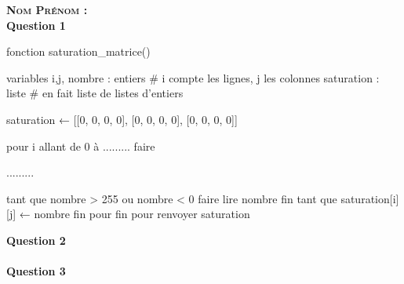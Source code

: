 \documentclass[a4paper,12pt]{article}
\begin{document}
{\large\bfseries \scshape Nom Prénom : \makebox[6cm]{\dotfill}}\\

\textbf{Question 1}\\

\begin{algo}    
fonction saturation_matrice()
    
    variables
        i,j, nombre : entiers # i compte les lignes, j les colonnes
        saturation  : liste  # en fait liste de listes d'entiers

    saturation ← [[0, 0, 0, 0], [0, 0, 0, 0], [0, 0, 0, 0]]
   
    pour i allant de 0 à ......... faire

        .........

            tant que nombre > 255 ou nombre < 0 faire
                lire nombre
            fin tant que
            saturation[i][j] ← nombre
        fin pour
    fin pour
    renvoyer saturation
\end{algo}

\textbf{Question 2}\\

\\

\textbf{Question 3}\\

\end{document}
